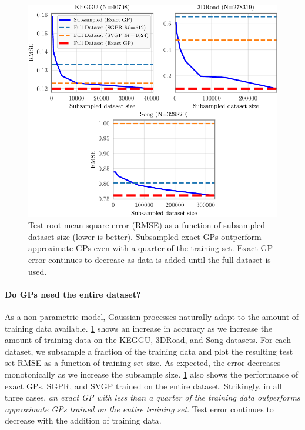 \begin{figure}[t!]
  \centering
  \includegraphics[width=0.7\linewidth]{figures/subsampling.pdf}
  \caption{
    Test root-mean-square error (RMSE) as a function of subsampled dataset size (lower is better).
    Subsampled exact GPs outperform approximate GPs even with a quarter of the training set.
    Exact GP error continues to decrease as data is added until the full dataset is used.
  }
  \label{fig:subsampling_results}
\end{figure}

\paragraph{Do GPs need the entire dataset?}
As a non-parametric model, Gaussian processes naturally adapt to the amount of training data available.
\cref{fig:subsampling_results} shows an increase in accuracy as we increase the amount of training data on the KEGGU, 3DRoad, and Song datasets.
For each dataset, we subsample a fraction of the training data and plot the resulting test set RMSE as a function of training set size.
As expected, the error decreases monotonically as we increase the subsample size.
\cref{fig:subsampling_results} also shows the performance of exact GPs, SGPR, and SVGP trained on the entire dataset.
Strikingly, in all three cases, \textit{an exact GP with less than a quarter of the training data outperforms approximate GPs trained on the entire training set}.
Test error continues to decrease with the addition of training data.

